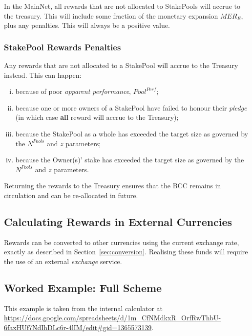 \documentclass[11pt,a4paper,dvipsnames,twosided,final]{article}
\newcommand{\khcomment}[1]{\todo[color=blue!20]{KH: #1}}
\newcommand{\bcc}{BCC{}}
\newcommand{\bcc}[1]{Bcc}
\begin{document}
In the MainNet, all rewards that are not allocated to StakePools will accrue to the treasury.  This will include some fraction of the
monetary expansion $\textit{MER}_E$, plus any penalties.  This will always be a positive value.

\subsubsection*{StakePool Rewards Penalties}
\label{sec:penalties}

Any rewards that are not allocated to a StakePool will accrue to the Treasury instead.  This can happen: %

\begin{enumerate}[i)]
\item
  because of poor \emph{apparent performance}, $\textit{Pool}^{\textit{Perf}}$;
\item
  because one or more owners of a StakePool have failed to honour their \emph{pledge} (in which case \textbf{all} reward will accrue to the Treasury);
\item
  because the StakePool as a whole has exceeded the target size as governed by the $N^{\textit{Pools}}$ and $z$ parameters;
\item
  because the Owner(s)' stake has exceeded the target size as governed by the $N^{\textit{Pools}}$ and $z$ parameters.
\end{enumerate}

\noindent
Returning the rewards to the Treasury ensures that the \bcc{} remains in circulation and can be re-allocated in future.



\subsection{Calculating Rewards in External Currencies}

Rewards can be converted to other currencies using the current exchange rate, exactly as described in
Section~\ref{sec:conversion}.  Realising these funds will require the use of an external \emph{exchange} service.

\clearpage
\subsection{Worked Example: Full Scheme}

This example is taken from the \TBCO{} internal calculator at
\url{https://docs.google.com/spreadsheets/d/1m_CfNMdkxR_OrfRwThbU-6faxHUf7NdIhDLc6r-4lIM/edit#gid=1365573139}.
\end{document}
